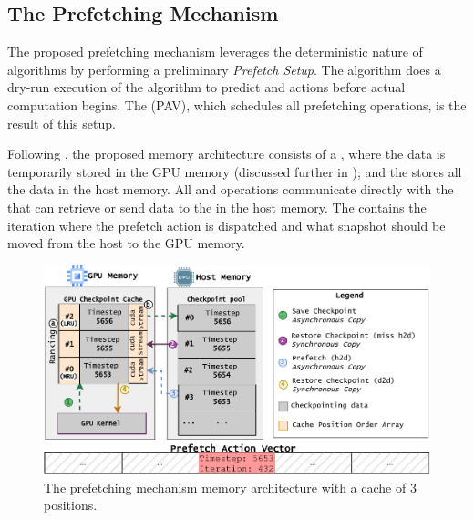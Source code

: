 \documentclass[Ingles,Final]{ic-tese-v3}
\begin{document}
\subsection{The Prefetching Mechanism}
\label{sec:gpuzip_prefetch}

The proposed prefetching mechanism leverages the deterministic nature of \checkpointing algorithms by performing a preliminary \textit{Prefetch Setup}. The algorithm does a dry-run execution of the \checkpointing algorithm to predict \save and \restore actions before actual computation begins. The \pav (PAV), which schedules all prefetching operations, is the result of this setup.

Following , the proposed memory architecture consists of a \cache, where the \checkpointing data is temporarily stored in the GPU memory (discussed further in ); and the \pool stores all the \checkpointing data in the host memory. All \save and \restore operations communicate directly with the \cache that can retrieve or send data to the \pool in the host memory. The \pav contains the iteration where the prefetch action is dispatched and what snapshot should be moved from the host to the GPU memory.

\begin{figure}[h!]
  \centering
  \includegraphics[width=1\linewidth,trim={0 0 0 0},clip]{figures/arch_prefetch.pdf}
  \caption[Memory architecture diagram (\checkpointprefetching)]{The prefetching mechanism memory architecture with a cache of 3 positions.}
  \label{fig:arch_prefetch}
\end{figure}
\end{document}
